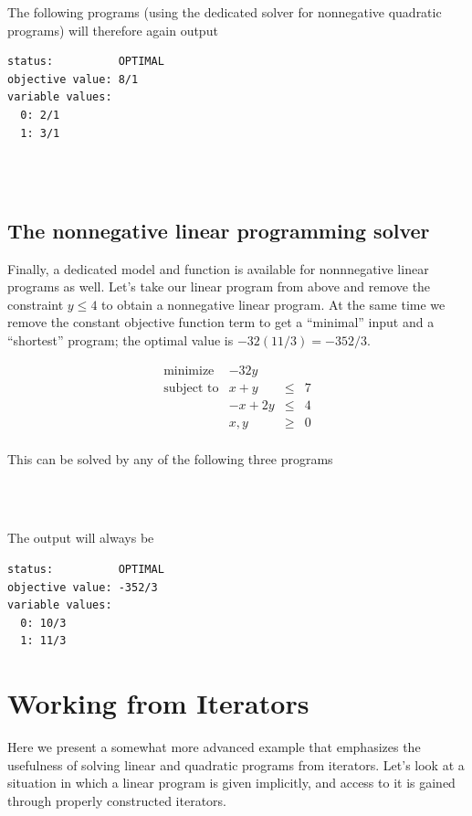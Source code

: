 The following programs (using the dedicated solver for nonnegative
quadratic programs) will therefore again output
\begin{verbatim}
status:          OPTIMAL
objective value: 8/1
variable values:
  0: 2/1
  1: 3/1
\end{verbatim}

\\
\\

\subsection{The nonnegative linear programming solver}
Finally, a dedicated model and function is available for nonnnegative linear
programs as well. Let's take our linear program from above and remove
the constraint $y\leq 4$ to obtain a nonnegative linear program. At
the same time we remove the constant objective function term to get
a ``minimal'' input and a ``shortest'' program; the optimal value is
$-32(11/3)=-352/3$.

\[
\begin{array}{lrcl}
\mbox{minimize}       & - 32y \\
\mbox{subject to}     & x + y &\leq& 7 \\
                      & -x + 2y &\leq& 4 \\
                      & x,y &\geq& 0 \\
\end{array}
\] 

This can be solved by any of the following three programs

\\
\\

The output will always be
\begin{verbatim}
status:          OPTIMAL
objective value: -352/3
variable values:
  0: 10/3
  1: 11/3
\end{verbatim}

\section{Working from Iterators\label{sec:QP-iterators}}
Here we present a somewhat more advanced example that emphasizes the
usefulness of solving linear and quadratic programs from iterators. 
Let's look at a situation in which a linear program is given implicitly, 
and access to it is gained through properly constructed iterators.

